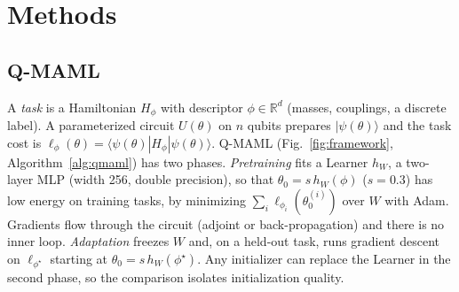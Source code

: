 \documentclass[pdflatex,sn-mathphys-num]{sn-jnl}
\begin{document}
\section{Methods}\label{sec:methods}

\subsection{Q-MAML}\label{sec:qmaml}

A \emph{task} is a Hamiltonian $H_\phi$ with descriptor $\phi\in\mathbb{R}^d$ (masses, couplings, a discrete label). A parameterized circuit $U(\theta)$ on $n$ qubits prepares $|\psi(\theta)\rangle$ and the task cost is $\ell_\phi(\theta)=\langle\psi(\theta)|H_\phi|\psi(\theta)\rangle$. Q-MAML (Fig.~\ref{fig:framework}, Algorithm~\ref{alg:qmaml}) has two phases. \emph{Pretraining} fits a Learner $h_W$, a two-layer MLP (width 256, double precision), so that $\theta_0=s\,h_W(\phi)$ ($s=0.3$) has low energy on training tasks, by minimizing $\sum_i\ell_{\phi_i}(\theta_0^{(i)})$ over $W$ with Adam. Gradients flow through the circuit (adjoint or back-propagation) and there is no inner loop. \emph{Adaptation} freezes $W$ and, on a held-out task, runs gradient descent on $\ell_{\phi^\star}$ starting at $\theta_0=s\,h_W(\phi^\star)$. Any initializer can replace the Learner in the second phase, so the comparison isolates initialization quality.
\end{document}
